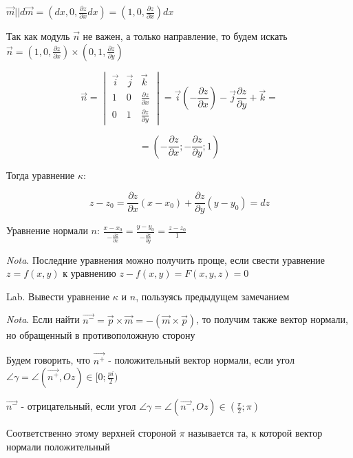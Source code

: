 \documentclass[12pt]{article}
\begin{document}
    $\displaystyle \overrightarrow{m} || d\overrightarrow{m} = (dx, 0, \frac{\partial z}{\partial x}dx) = (1, 0, \frac{\partial z}{\partial x}) dx$

    Так как модуль $\overrightarrow{n}$ не важен, а только направление, то будем искать
    $\displaystyle \overrightarrow{n} = (1, 0, \frac{\partial z}{\partial x}) \times (0, 1, \frac{\partial z}{\partial y})$

    \[\overrightarrow{n} =
    \begin{vmatrix} \overrightarrow{i} & \overrightarrow{j} & \overrightarrow{k} \\
        1 & 0 & \frac{\partial z}{\partial x} \\ 0 & 1 & \frac{\partial z}{\partial y}
    \end{vmatrix} = \overrightarrow{i} (-\frac{\partial z}{\partial x}) - \overrightarrow{j} \frac{\partial z}{\partial y} + \overrightarrow{k} = \]

    \[= (-\frac{\partial z}{\partial x}; -\frac{\partial z}{\partial y}; 1)\]

    Тогда уравнение $\kappa$:

    \[z - z_0 = \frac{\partial z}{\partial x}(x - x_0) + \frac{\partial z}{\partial y} (y - y_0) = dz\]

    Уравнение нормали $n$: $\displaystyle \frac{x - x_0}{-\frac{\partial z}{\partial x}} = \frac{y - y_0}{-\frac{\partial z}{\partial y}} = \frac{z - z_0}{1}$

    \vspace{3mm}
\textit{Nota}. Последние уравнения можно получить проще, если свести уравнение $z = f(x, y)$ к уравнению $z - f(x, y) = F(x, y, z) = 0$

    Lab. Вывести уравнение $\kappa$ и $n$, пользуясь предыдущем замечанием

    \vspace{3mm}
\textit{Nota}. Если найти $\overrightarrow{n^-} = \overrightarrow{p} \times \overrightarrow{m} = - (\overrightarrow{m} \times \overrightarrow{p})$, то получим также вектор нормали, но обращенный в противоположную сторону

    Будем говорить, что $\overrightarrow{n^+}$ - положительный вектор нормали, если угол $\displaystyle \angle\gamma = \angle (\overrightarrow{n^+}, Oz) \in [0; \frac{pi}{2})$

    $\overrightarrow{n^-}$ - отрицательный, если угол $\displaystyle \angle\gamma = \angle (\overrightarrow{n^-}, Oz) \in (\frac{\pi}{2}; \pi)$

    Соответственно этому верхней стороной $\pi$ называется та, к которой вектор нормали положительный
\end{document}
